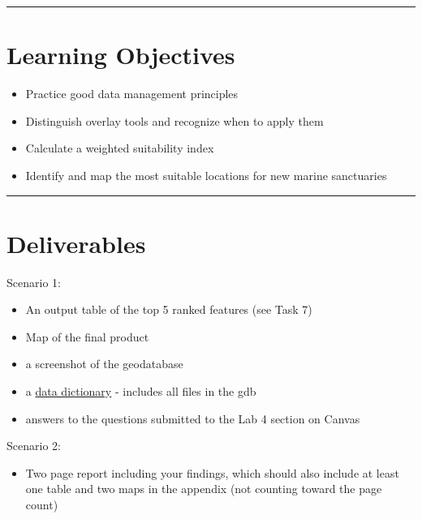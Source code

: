 \documentclass[
]{book}
\providecommand{\tightlist}{%
  \setlength{\itemsep}{0pt}\setlength{\parskip}{0pt}}
\begin{document}
\begin{center}\rule{0.5\linewidth}{0.5pt}\end{center}

\hypertarget{learning-objectives-4}{%
\section*{Learning Objectives}\label{learning-objectives-4}}

\begin{itemize}
\tightlist
\item
  Practice good data management principles
\item
  Distinguish overlay tools and recognize when to apply them
\item
  Calculate a weighted suitability index
\item
  Identify and map the most suitable locations for new marine sanctuaries
\end{itemize}

\begin{center}\rule{0.5\linewidth}{0.5pt}\end{center}

\hypertarget{lab5-deliverables}{%
\section*{Deliverables}\label{lab5-deliverables}}

Scenario 1:

\begin{itemize}
\tightlist
\item
  An output table of the top 5 ranked features (see Task 7)
\item
  Map of the final product
\item
  a screenshot of the geodatabase
\item
  a \href{https://www.usgs.gov/data-management/data-dictionaries}{data dictionary} - includes all files in the gdb
\item
  answers to the questions submitted to the Lab 4 section on Canvas
\end{itemize}

Scenario 2:

\begin{itemize}
\tightlist
\item
  Two page report including your findings, which should also include at least one table and two maps in the appendix (not counting toward the page count)
\end{itemize}
\end{document}

